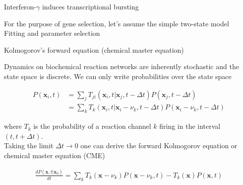 \documentclass[aspectratio=1610]{beamer}					%
\begin{document}
\begin{frame}{Interferon-$\gamma$ induces transcriptional bursting}

For the purpose of gene selection, let's assume the simple two-state model\\
\vspace{0.2in}
Fitting and parameter selection


\end{frame}




\begin{frame}{Kolmogorov's forward equation (chemical master equation)}

Dynamics on biochemical reaction networks are inherently stochastic and the state space is discrete. We can only write probabilities over the state space

\vspace{0.1in}

\begin{align*}
P(\mathbf{x}_{i},t) &= \sum_{j} T_{ji}(\mathbf{x}_{i},t|\mathbf{x}_{j},t-\Delta t)P(\mathbf{x}_{j},t-\Delta t)\\ 
&= \sum_{k} T_{k}(\mathbf{x}_{i},t|\mathbf{x}_{i}-\nu_{k},t-\Delta t)P(\mathbf{x}_{i}-\nu_{k},t-\Delta t)
\end{align*}

where $T_{k}$ is the probability of a reaction channel $k$ firing in the interval $(t,t+\Delta t)$.\\
\vspace{0.1in}
Taking the limit $\Delta t \rightarrow 0$ one can derive the forward Kolmogorov equation or chemical master equation (CME)

\begin{align*}
\frac{dP(\mathbf{x},t|\mathbf{x}_{0})}{dt} = \sum_{k} T_{k}(\mathbf{x}-\nu_{k})P(\mathbf{x}-\nu_{k},t) - T_{k}(\mathbf{x})P(\mathbf{x},t)
\end{align*}

\end{frame}
\end{document}

